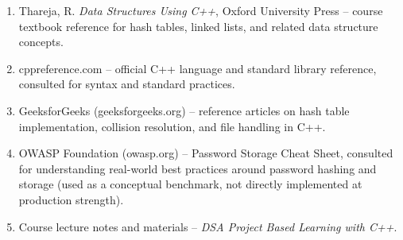 \documentclass[11pt,a4paper]{article}
\newcommand{\answerbox}[2][]{%
    \vspace{2pt}
    \begin{framed}
    #2
    \end{framed}
}
\begin{document}
\answerbox{
\begin{enumerate}[leftmargin=5mm, itemsep=1pt, topsep=2pt]
\item Thareja, R. \textit{Data Structures Using C++}, Oxford University Press -- course textbook reference for hash tables, linked lists, and related data structure concepts.
\item cppreference.com -- official C++ language and standard library reference, consulted for syntax and standard practices.
\item GeeksforGeeks (geeksforgeeks.org) -- reference articles on hash table implementation, collision resolution, and file handling in C++.
\item OWASP Foundation (owasp.org) -- Password Storage Cheat Sheet, consulted for understanding real-world best practices around password hashing and storage (used as a conceptual benchmark, not directly implemented at production strength).
\item Course lecture notes and materials -- \textit{DSA Project Based Learning with C++}.
\end{enumerate}}
\end{document}
